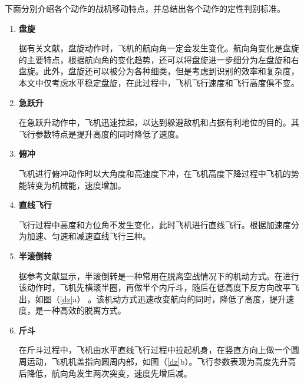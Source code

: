 \documentclass{my_paper}
\begin{document}
\newpage 
下面分别介绍各个动作的战机移动特点，并总结出各个动作的定性判别标准。
\begin{enumerate}
    \item \textbf{盘旋}
    
    据有关文献\cite{4}，盘旋动作时，飞机的航向角一定会发生变化。航向角变化是盘旋的主要特点，根据航向角的变化趋势，还可以将盘旋进一步细分为左盘旋和右盘旋。此外，盘旋还可以被分为各种细类，但是考虑到识别的效率和复杂度，本文中仅考虑水平稳定盘旋，在此过程中，飞机飞行速度和飞行高度俱不变。

    \item \textbf{急跃升}
    
    在急跃升动作中，飞机迅速拉起，以达到躲避敌机和占据有利地位的目的。其飞行参数特点是提升高度的同时降低了速度。
    \item \textbf{俯冲}
    
    飞机进行俯冲动作时以大角度和高速度下冲，在飞机高度下降过程中飞机的势能转变为机械能，速度增加。
    \item \textbf{直线飞行}
    
    飞行过程中高度和方位角不发生变化，此时飞机进行直线飞行。根据加速度分为加速、匀速和减速直线飞行三种。

    \item \textbf{半滚倒转}
    
    据参考文献显示\cite{5}，半滚倒转是一种常用在脱离空战情况下的机动方式。在进行该动作时，飞机先横滚半圈，再做半个内斤斗，随后在低高度下反方向改平飞出，如图（\ref{dz}a） 。该机动方式迅速改变航向的同时，降低了高度，提升速度，是一种高效的脱离方式。

    \item \textbf{斤斗}
    
    在斤斗过程中，飞机由水平直线飞行过程中拉起机身，在竖直方向上做一个圆周运动，飞机机盖指向圆周内部，如图（\ref{dz}b）。飞行参数表现为高度先升高后降低，航向角发生两次突变，速度先增后减。


\end{enumerate}
\end{document}

